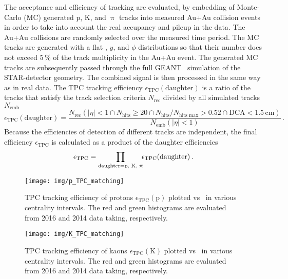 The acceptance and efficiency of tracking are evaluated, by embedding of Monte-Carlo (MC) generated p, K, and $\uppi$ tracks into measured Au+Au collision events in order to take into account the real accupancy and pileup in the data. The Au+Au collisions are randomly selected over the measured time period. The MC tracks are generated with a flat \pt, $y$, and $\phi$ distributions so that their number does not exceed $5\,\%$ of the track multiplicity in the Au+Au event. The generated MC tracks are subsequently passed through the full GEANT~\cite{GEANT} simulation of the STAR-detector geometry. The combined signal is then processed in the same way as in real data. The TPC tracking efficiency $\epsilon_\mathrm{TPC}(\text{daughter})$ is a ratio of the tracks that satisfy the track selection criteria $N_\mathrm{rec}$ divided by all simulated tracks $N_\mathrm{emb}$
\begin{equation}
 \epsilon_\mathrm{TPC}(\text{daughter}) = \frac{N_\mathrm{rec}(|\eta|<1 \cap N_\mathrm{hits} \geq 20 \cap N_\mathrm{hits} / N_\text{hits max} > 0.52 \cap \text{DCA} < 1.5\,\text{cm})}{N_\mathrm{emb}(|\eta|<1)}\,.
\end{equation}
Because the efficiencies of detection of different tracks are independent, the final efficiency $\epsilon_\mathrm{TPC}$ is calculated as a product of the daughter efficiencies 
\begin{equation}
 \epsilon_\mathrm{TPC} = \prod_{\text{daughter}=\text{p, K, }\uppi}\!\!\epsilon_\mathrm{TPC}(\text{daughter})\,.
\end{equation}

\begin{figure}[!htb]
\centering
\texttt{[image: img/p\_TPC\_matching]}
\vspace{-0.8cm}
\caption{\label{pTPCeff} TPC tracking efficiency of protons $\epsilon_\mathrm{TPC}(\mathrm{p})$ plotted vs \pt\ in various centrality intervals. The red and green histograms are evaluated from 2016 and 2014 data taking, respectively.}

\end{figure}

\begin{figure}[!htb]
\centering
\texttt{[image: img/K\_TPC\_matching]}
\vspace{-0.8cm}
\caption{\label{KTPCeff} TPC tracking efficiency of kaons $\epsilon_\mathrm{TPC}(\mathrm{K})$ plotted vs \pt\ in various centrality intervals. The red and green histograms are evaluated from 2016 and 2014 data taking, respectively.}

\end{figure}


